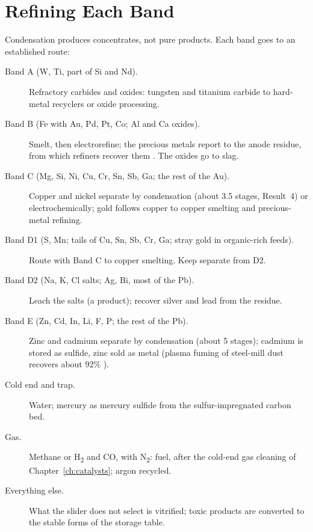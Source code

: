 \documentclass[11pt,a4paper]{article}
\begin{document}
\section{Refining Each Band}\label{ch:refining}
Condensation produces concentrates, not pure products. Each band goes to an established route:
\begin{description}
\item[Band A (W, Ti, part of Si and Nd).] Refractory carbides and oxides: tungsten and titanium carbide to hard-metal recyclers or oxide processing.
\item[Band B (Fe with Au, Pd, Pt, Co; Al and Ca oxides).] Smelt, then electrorefine; the precious metals report to the anode residue, from which refiners recover them \citep{cui2008}. The oxides go to slag.
\item[Band C (Mg, Si, Ni, Cu, Cr, Sn, Sb, Ga; the rest of the Au).] Copper and nickel separate by condensation (about 3.5 stages, Result~4) or electrochemically; gold follows copper to copper smelting and precious-metal refining.
\item[Band D1 (S, Mn; tails of Cu, Sn, Sb, Cr, Ga; stray gold in organic-rich feeds).] Route with Band C to copper smelting. Keep separate from D2.
\item[Band D2 (Na, K, Cl salts; Ag, Bi, most of the Pb).] Leach the salts (a product); recover silver and lead from the residue.
\item[Band E (Zn, Cd, In, Li, F, P; the rest of the Pb).] Zinc and cadmium separate by condensation (about 5 stages); cadmium is stored as sulfide, zinc sold as metal (plasma fuming of steel-mill dust recovers about 92\% \citep{cusano2017bref}).
\item[Cold end and trap.] Water; mercury as mercury sulfide from the sulfur-impregnated carbon bed.
\item[Gas.] Methane or H\textsubscript{2} and CO, with N\textsubscript{2}: fuel, after the cold-end gas cleaning of Chapter~\ref{ch:catalysts}; argon recycled.
\item[Everything else.] What the slider does not select is vitrified; toxic products are converted to the stable forms of the storage table.
\end{description}

\end{document}
